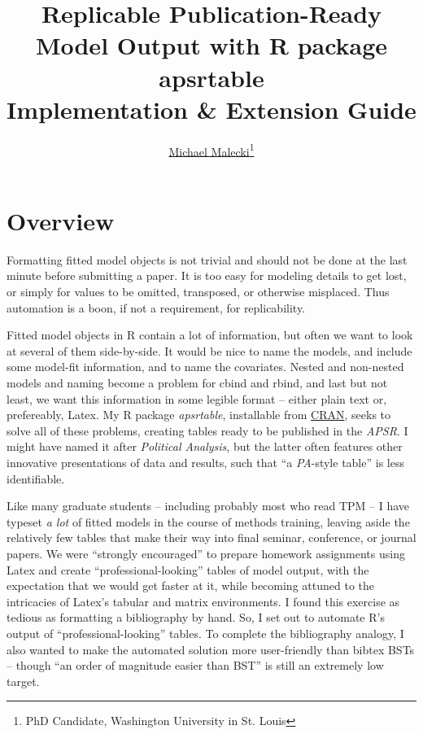 \documentclass[10pt]{article} %
\begin{document}
\title{Replicable Publication-Ready Model Output with R package apsrtable\\Implementation \& Extension Guide}
\author{\href{http://malecki.wustl.edu}{Michael Malecki}\footnote{PhD Candidate, Washington University in St. Louis}}
\maketitle

\section{Overview}
\label{sec:overview}

Formatting fitted model objects is not trivial and should not be done at the last minute before submitting a paper. It is too easy for modeling details to get lost, or simply for values to be omitted, transposed, or otherwise misplaced. Thus automation is a boon, if not a requirement, for replicability.

Fitted model objects in R contain a lot of information, but often we want to look at several of them side-by-side. It would be nice to name the models, and include some model-fit information, and to name the covariates. Nested and non-nested models and naming become a problem for cbind and rbind, and last but not least, we want this information in some legible format -- either plain text or, prefereably, Latex. My R package \textit{apsrtable}, installable from \href{http://cran.r-project.org/web/packages/apsrtable/index.html}{CRAN}, seeks to solve all of these problems, creating tables ready to be published in the \textit{APSR}. I might have named it after \textit{Political Analysis}, but the latter often features other innovative presentations of data and results, such that ``a \textit{PA}-style table'' is less identifiable.

Like many graduate students -- including probably most who read TPM -- I have typeset \emph{a lot} of fitted models in the course of methods training, leaving aside the relatively few tables that make their way into final seminar, conference, or journal papers. We were ``strongly encouraged'' to prepare homework assignments using Latex and create ``professional-looking'' tables of model output, with the expectation that we would get faster at it, while becoming attuned to the intricacies of Latex's tabular and matrix environments. I found this exercise as tedious as formatting a bibliography by hand. So, I set out to automate R's output of ``professional-looking'' tables. To complete the bibliography analogy, I also wanted to make the automated solution more user-friendly than bibtex BSTs -- though ``an order of magnitude easier than BST'' is still an extremely low target.
\end{document}
